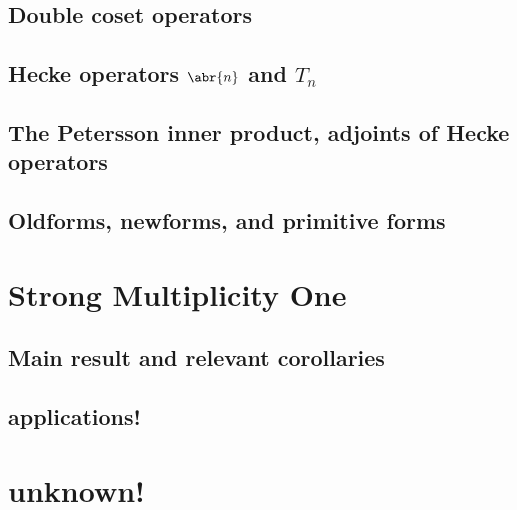 \documentclass[10pt,leqno]{article}
\begin{document}
\subsection{Double coset operators}
\subsection{Hecke operators $\abr{n}$ and $T_n$}
\subsection{The Petersson inner product, adjoints of Hecke operators}
\subsection{Oldforms, newforms, and primitive forms}

\newpage\section{Strong Multiplicity One}
\subsection{Main result and relevant corollaries}
\subsection{applications!}

\newpage\section{unknown!}
\end{document}
